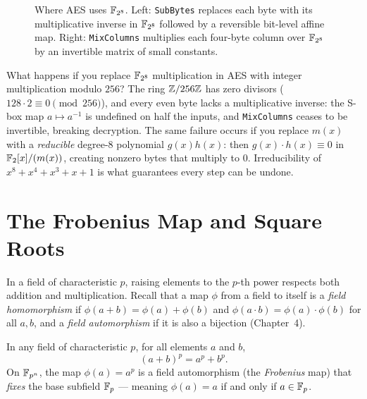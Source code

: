 \begin{figure}[htbp]
\caption{Where AES uses $\mathbb{F}_{2^8}$. Left: \texttt{SubBytes} replaces each byte with its multiplicative inverse in $\mathbb{F}_{2^8}$ followed by a reversible bit-level affine map. Right: \texttt{MixColumns} multiplies each four-byte column over $\mathbb{F}_{2^8}$ by an invertible matrix of small constants.}
\label{ch06:fig-aes-field-ops}
\end{figure}

\begin{attackbox}
What happens if you replace $\mathbb{F}_{2^8}$ multiplication in AES with integer
multiplication modulo $256$? The ring $\mathbb{Z}/256\mathbb{Z}$ has zero divisors ($128 \cdot
2 \equiv 0 \pmod{256}$), and every even byte lacks a multiplicative inverse:
the S-box map $a \mapsto a^{-1}$ is undefined on half the inputs, and
\texttt{MixColumns} ceases to be invertible, breaking decryption. The same
failure occurs if you replace $m(x)$ with a \emph{reducible} degree-$8$
polynomial $g(x)h(x)$: then $g(x)\cdot h(x) \equiv 0$ in $\mathbb{F}_2[x]/(m(x))$,
creating nonzero bytes that multiply to $0$. Irreducibility of
$x^8+x^4+x^3+x+1$ is what guarantees every step can be undone.
\end{attackbox}

\section{The Frobenius Map and Square Roots}
\label{ch06:frobenius}

In a field of characteristic $p$, raising elements to the $p$-th power respects
both addition and multiplication. Recall that a map $\phi$ from a field to
itself is a \emph{field homomorphism} if $\phi(a+b) = \phi(a)+\phi(b)$ and
$\phi(a\cdot b) = \phi(a)\cdot\phi(b)$ for all $a,b$, and a \emph{field
automorphism} if it is also a bijection (Chapter~4).

\begin{theorem}
\label{ch06:thm-frobenius}
In any field of characteristic $p$, for all elements $a$ and $b$,
\[
(a+b)^p = a^p + b^p.
\]
On $\mathbb{F}_{p^n}$, the map $\phi(a) = a^p$ is a field automorphism (the
\emph{Frobenius} map) that \emph{fixes} the base subfield $\mathbb{F}_p$ --- meaning
$\phi(a) = a$ if and only if $a \in \mathbb{F}_p$.
\end{theorem}

